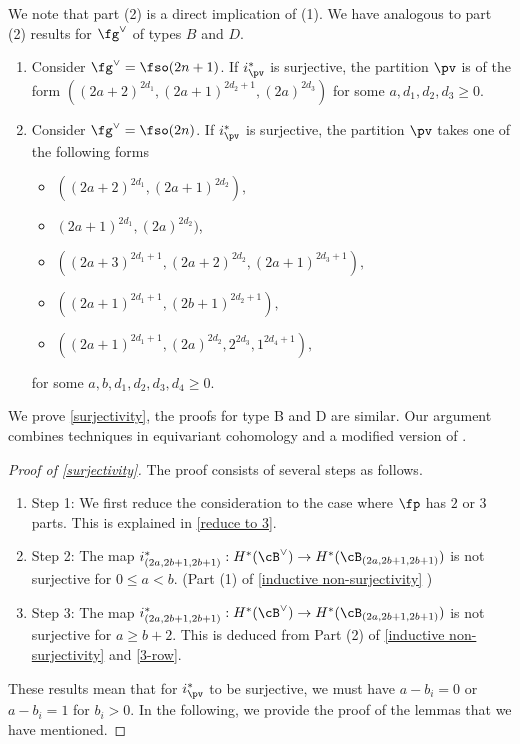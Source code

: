 \documentclass[12pt]{amsart}
\begin{document}
We note that part (2) is a direct implication of (1). We have analogous to part (2) results for $\fg^\vee$ of types $B$ and $D$.
\begin{theorem}\label{surjectivity B C D} \leavevmode
\begin{enumerate}
    \item Consider $\fg^\vee= \fso({2n+1})$. If $i_\pv^{*}$ is surjective, the partition $\pv$ is of the form $((2a+2)^{2d_1}, (2a+1)^{2d_2+1}, (2a)^{2d_3})$ for some $a, d_1, d_2, d_3\geqslant 0$.
    \item Consider $\fg^\vee= \fso({2n})$. If $i_\pv^{*}$ is surjective, the partition $\pv$ takes one of the following forms
    \begin{itemize}
        \item $((2a+2)^{2d_1}, (2a+1)^{2d_2}),$ 
        \item $(2a+1)^{2d_1}, (2a)^{2d_2})$,
        \item $((2a+3)^{2d_1+1}, (2a+2)^{2d_2}, (2a+1)^{2d_3+1}),$
        \item $((2a+1)^{2d_1+1},(2b+1)^{2d_2+1}),$
        \item $((2a+1)^{2d_1+1},(2a)^{2d_2}, 2^{2d_3},1^{2d_4+1}),$
    \end{itemize}
    for some $a, b, d_1, d_2, d_3, d_4\geqslant 0$.
\end{enumerate}
\end{theorem}
We prove \cref{surjectivity}, the proofs for type B and D are similar. Our argument combines techniques in equivariant cohomology and a modified version of \cite[Section 4.4]{surjectiveargument}.
\begin{proof}[Proof of \cref{surjectivity}]
    The proof consists of several steps as follows.
    \begin{enumerate}
        \item Step 1: We first reduce the consideration to the case where $\fp$ has $2$ or $3$ parts. This is explained in \cref{reduce to 3}.
        \item Step 2: The map $i^{*}_{(2a,2b+1,2b+1)}: H^*(\cB^\vee)\rightarrow H^*(\cB_{(2a,2b+1,2b+1)})$ is not surjective for $0\leqslant a< b$. (Part (1) of \cref{inductive non-surjectivity} )
        \item Step 3: The map $i^{*}_{(2a,2b+1,2b+1)}: H^*(\cB^\vee)\rightarrow H^*(\cB_{(2a,2b+1,2b+1)})$ is not surjective for $a\geqslant b+2$. This is deduced from Part (2) of \cref{inductive non-surjectivity} and \cref{3-row}.
    \end{enumerate}
    These results mean that for $i_{\pv}^*$ to be surjective, we must have $a-b_i= 0$ or $a-b_i= 1$ for $b_i> 0$. In the following, we provide the proof of the lemmas that we have mentioned.
\end{proof}
\end{document}
